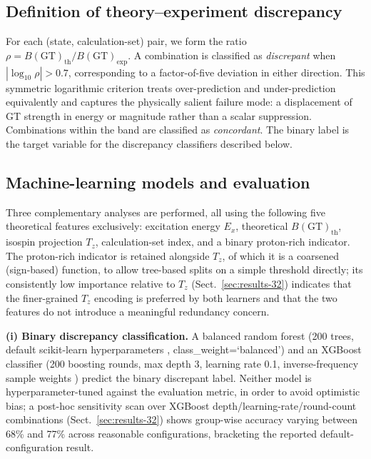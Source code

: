 \documentclass[10pt,twocolumn]{article}
\begin{document}
\subsection{Definition of theory--experiment discrepancy}
\label{sec:discrepancy-def}

For each (state, calculation-set) pair, we form the ratio $\rho = B(\mathrm{GT})_{\mathrm{th}} / B(\mathrm{GT})_{\mathrm{exp}}$. A combination is classified as \emph{discrepant} when $|\log_{10}\rho| > 0.7$, corresponding to a factor-of-five deviation in either direction. This symmetric logarithmic criterion treats over-prediction and under-prediction equivalently and captures the physically salient failure mode: a displacement of GT strength in energy or magnitude rather than a scalar suppression. Combinations within the band are classified as \emph{concordant}. The binary label is the target variable for the discrepancy classifiers described below.

\subsection{Machine-learning models and evaluation}
\label{sec:ml-models}

Three complementary analyses are performed, all using the following five theoretical features exclusively: excitation energy $E_x$, theoretical $B(\mathrm{GT})_{\mathrm{th}}$, isospin projection $T_z$, calculation-set index, and a binary proton-rich indicator. The proton-rich indicator is retained alongside $T_z$, of which it is a coarsened (sign-based) function, to allow tree-based splits on a simple threshold directly; its consistently low importance relative to $T_z$ (Sect.~\ref{sec:results-32}) indicates that the finer-grained $T_z$ encoding is preferred by both learners and that the two features do not introduce a meaningful redundancy concern.

\textbf{(i) Binary discrepancy classification.} A balanced random forest (200 trees, default scikit-learn hyperparameters \cite{ref14}, class\_weight=`balanced') and an XGBoost classifier (200 boosting rounds, max depth 3, learning rate 0.1, inverse-frequency sample weights \cite{ref_xgboost}) predict the binary discrepant label. Neither model is hyperparameter-tuned against the evaluation metric, in order to avoid optimistic bias; a post-hoc sensitivity scan over XGBoost depth/learning-rate/round-count combinations (Sect.~\ref{sec:results-32}) shows group-wise accuracy varying between 68\% and 77\% across reasonable configurations, bracketing the reported default-configuration result.
\end{document}
